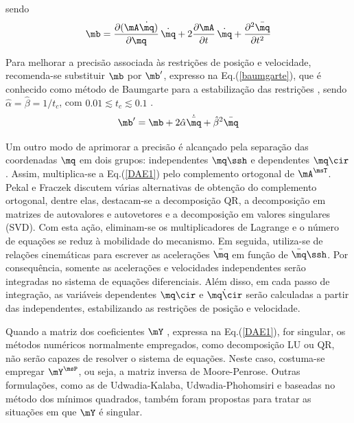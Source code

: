 \documentclass[]{politex}
\begin{document}
\vspace{0.5cm}

sendo
\begin{equation}
\mb = \frac{\partial (\mA \dot{\mq})}{\partial \mq} \, \dot{\mq} + 2 \frac{\partial \mA}{\partial t} \, \dot{\mq} + \frac{\partial^2 \bar{\mq}}{\partial t^2}
\end{equation}

Para melhorar a precisão associada às restrições de posição e velocidade, recomenda-se substituir $\mb$ por $\mb'$, expresso na Eq.(\ref{baumgarte}), que é conhecido como método de Baumgarte para a estabilização das restrições \cite{Baumgarte, Featherstone, Nikravesh}, sendo $\hat{\alpha} = \hat{\beta} = 1/t_c$, com  $0.01 \lesssim t_c \lesssim 0.1 $ \cite{Featherstone}. 
%
\begin{equation}
\mb' = \mb + 2\hat{\alpha} \dot{\bar{\mq}} + \hat{\beta}^2 \bar{\mq}
\label{baumgarte}
\end{equation}


Um outro modo de aprimorar a precisão é alcançado pela separação das coordenadas $\mq$ em dois grupos: independentes $\mq\ssh$ e dependentes $\mq\cir$. Assim, multiplica-se a Eq.(\ref{DAE1}) pelo complemento ortogonal \cite{Kordjazi} de $\mA^\msT$. Pekal e Fraczek \cite{Pekal} discutem várias alternativas de obtenção do complemento ortogonal, dentre elas, destacam-se a decomposição QR, a decomposição em matrizes de autovalores e autovetores e a decomposição em valores singulares (SVD). Com esta ação, eliminam-se os multiplicadores de Lagrange e o número de equações se reduz à mobilidade do mecanismo. Em seguida, utiliza-se de relações cinemáticas para  escrever as acelerações $\ddot{\mq}$ em função de $\ddot{\mq}\ssh$. Por consequência, somente as acelerações e velocidades independentes serão integradas no sistema de equações diferenciais. Além disso, em cada passo de integração, as variáveis dependentes $\mq\cir$ e $\dot{\mq\cir}$ serão calculadas a partir das independentes, estabilizando as restrições de posição e velocidade.

Quando a matriz dos coeficientes $\mY$ , expressa na Eq.(\ref{DAE1}), for singular, os métodos numéricos normalmente empregados, como decomposição LU ou QR, não serão capazes de resolver o sistema de equações. Neste caso, costuma-se empregar $\mY^\msP$, ou seja, a matriz inversa de Moore-Penrose. Outras formulações, como as de Udwadia-Kalaba, Udwadia-Phohomsiri e baseadas no método dos mínimos quadrados, também foram propostas para tratar as situações em que $\mY$ é singular.
\end{document}
